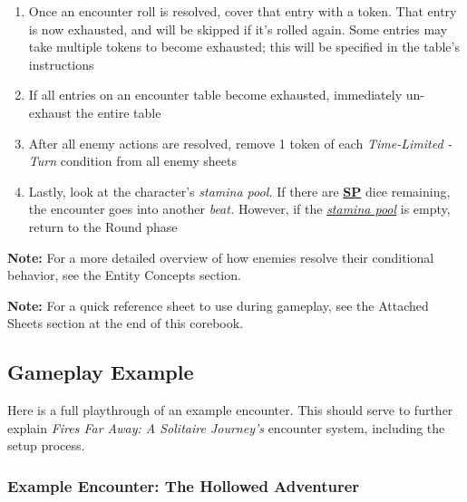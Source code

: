 \documentclass[12pt]{article}
\newcommand{\refto}[1]{\hyperlink{#1}{\textbf{#1}}}
\newcommand{\reftoit}[1]{\hyperlink{#1}{\emph{#1}}}
\begin{document}
\begin{multicols*}{2}
\begin{enumerate}
\item Once an encounter roll is resolved, cover that entry with a token. That entry is now exhausted, and will be skipped if it’s rolled again. Some entries may take multiple tokens to become exhausted; this will be specified in the table’s instructions
\item If all entries on an encounter table become exhausted, immediately un-exhaust the entire table
\item After all enemy actions are resolved, remove 1 token of each \emph{Time-Limited - Turn} condition from all enemy sheets
\item Lastly, look at the character’s \emph{stamina pool.} If there are \refto{SP} dice remaining, the encounter goes into another \emph{beat.} However, if the \reftoit{stamina pool} is empty, return to the Round phase
\end{enumerate}

\begin{tcolorbox}
\textbf{Note:} For a more detailed overview of how enemies resolve their conditional behavior, see the Entity Concepts section.
\end{tcolorbox}

\begin{tcolorbox}
\textbf{Note:} For a quick reference sheet to use during gameplay, see the Attached Sheets section at the end of this corebook.
\end{tcolorbox}

\end{multicols*}

\pagebreak

\subsection{Gameplay Example}
Here is a full playthrough of an example encounter. This should serve to further explain \emph{Fires Far Away: A Solitaire Journey’s} encounter system, including the setup process.
\subsubsection*{Example Encounter: The Hollowed Adventurer}
\begin{center}
\end{center}
\end{document}
